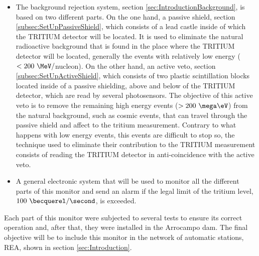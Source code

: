 \begin{itemize}
\item{} The background rejection system, section \ref{sec:IntroductionBackground}, is based on two different parts. On the one hand, a passive shield, section \ref{subsec:SetUpPassiveShield}, which consists of a lead castle inside of which the TRITIUM detector will be located. It is used to eliminate the natural radioactive background that is found in the place where the TRITIUM detector will be located, generally the events with relatively low energy ($<200~\MeV/$nucleon). On the other hand, an active veto, section \ref{subsec:SetUpActiveShield}, which consists of two plastic scintillation blocks located inside of a passive shielding, above and below of the TRITIUM detector, which are read by several photosensors. The objective of this active veto is to remove the remaining high energy events ($>200~\mega\eV$) from the natural background, such as cosmic events, that can travel through the passive shield and affect to the tritium measurement. Contrary to what happens with low energy events, this events are difficult to stop so, the technique used to eliminate their contribution to the TRITIUM measurement consists of reading the TRITIUM detector in anti-coincidence with the active veto.

\item{} A general electronic system that will be used to monitor all the different parts of this monitor and send an alarm if the legal limit of the tritium level, $100~\becquerel/\second$, is exceeded.

\end{itemize}

Each part of this monitor were subjected to several tests to ensure its correct operation and, after that, they were installed in the Arrocampo dam. The final objective will be to include this monitor in the network of automatic stations, REA, shown in section \ref{sec:Introduction}.